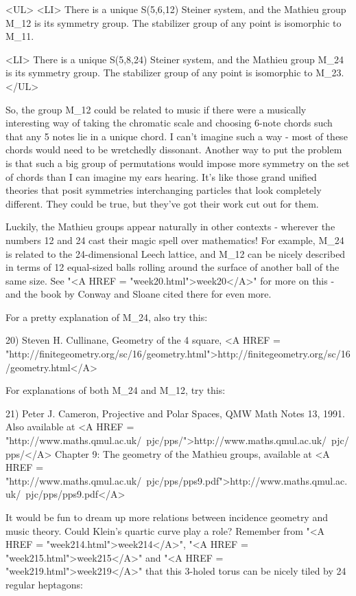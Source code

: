 <UL>
<LI>
There is a unique S(5,6,12) Steiner system, and the Mathieu group
M_{12} is its symmetry group.  The stabilizer group of any point 
is isomorphic to M_{11}.

<LI>
There is a unique S(5,8,24) Steiner system, and the Mathieu group
M_{24} is its symmetry group.  The stabilizer group of any point 
is isomorphic to M_{23}.
</UL>

So, the group M_{12} could be related to music if there were a 
musically interesting way of taking the chromatic scale and choosing 
6-note chords such that any 5 notes lie in a unique chord.  I can't 
imagine such a way - most of these chords would need to be 
wretchedly dissonant.  Another way to put the problem is that such 
a big group of permutations would impose more symmetry on the set
of chords than I can imagine my ears hearing.  It's like those 
grand unified theories that posit symmetries interchanging particles 
that look completely different.   They could be true, but they've 
got their work cut out for them.

Luckily, the Mathieu groups appear naturally in other contexts - 
wherever the numbers 12 and 24 cast their magic spell over mathematics!  
For example, M_{24} is related to the 24-dimensional Leech lattice, 
and M_{12} can be nicely described in terms of 12 equal-sized balls 
rolling around the surface of another ball of the same size.  See 
"<A HREF = "week20.html">week20</A>" for more on this - and the book by Conway and Sloane cited 
there for even more.  

For a pretty explanation of M_{24}, also try this:

20) Steven H. Cullinane, Geometry of the 4  square, 
<A HREF = "http://finitegeometry.org/sc/16/geometry.html">http://finitegeometry.org/sc/16/geometry.html</A>

For explanations of both M_{24} and M_{12}, try this:

21) Peter J. Cameron, Projective and Polar Spaces, QMW Math Notes
13, 1991.  Also available at <A HREF = "http://www.maths.qmul.ac.uk/~pjc/pps/">http://www.maths.qmul.ac.uk/~pjc/pps/</A>
Chapter 9: The geometry of the Mathieu groups, available at 
<A HREF = "http://www.maths.qmul.ac.uk/~pjc/pps/pps9.pdf">http://www.maths.qmul.ac.uk/~pjc/pps/pps9.pdf</A>

It would be fun to dream up more relations between incidence geometry
and music theory.  Could Klein's quartic curve play a role?  Remember
from "<A HREF = "week214.html">week214</A>", "<A HREF =
"week215.html">week215</A>" and "<A HREF =
"week219.html">week219</A>" that this 3-holed torus can be nicely
tiled by 24 regular heptagons:

